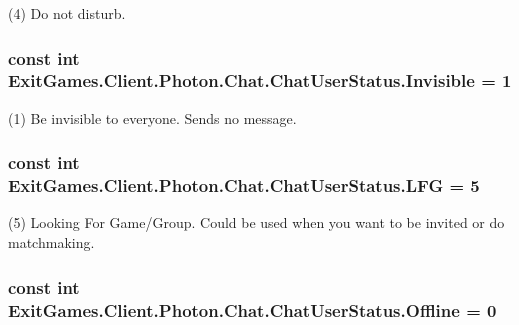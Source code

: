 (4) Do not disturb.

\subsubsection[{\texorpdfstring{Invisible}{Invisible}}]{\setlength{\rightskip}{0pt plus 5cm}const int Exit\+Games.\+Client.\+Photon.\+Chat.\+Chat\+User\+Status.\+Invisible = 1}\hypertarget{class_exit_games_1_1_client_1_1_photon_1_1_chat_1_1_chat_user_status_a5d307822db6e769821d9dc86477171e2}{}\label{class_exit_games_1_1_client_1_1_photon_1_1_chat_1_1_chat_user_status_a5d307822db6e769821d9dc86477171e2}


(1) Be invisible to everyone. Sends no message.

\subsubsection[{\texorpdfstring{L\+FG}{LFG}}]{\setlength{\rightskip}{0pt plus 5cm}const int Exit\+Games.\+Client.\+Photon.\+Chat.\+Chat\+User\+Status.\+L\+FG = 5}\hypertarget{class_exit_games_1_1_client_1_1_photon_1_1_chat_1_1_chat_user_status_af729b56f77e02acbe8d1f079ace322a3}{}\label{class_exit_games_1_1_client_1_1_photon_1_1_chat_1_1_chat_user_status_af729b56f77e02acbe8d1f079ace322a3}


(5) Looking For Game/\+Group. Could be used when you want to be invited or do matchmaking.

\subsubsection[{\texorpdfstring{Offline}{Offline}}]{\setlength{\rightskip}{0pt plus 5cm}const int Exit\+Games.\+Client.\+Photon.\+Chat.\+Chat\+User\+Status.\+Offline = 0}\hypertarget{class_exit_games_1_1_client_1_1_photon_1_1_chat_1_1_chat_user_status_a3ad23f7750af493dc34e7bb84fa6edcd}{}\label{class_exit_games_1_1_client_1_1_photon_1_1_chat_1_1_chat_user_status_a3ad23f7750af493dc34e7bb84fa6edcd}


